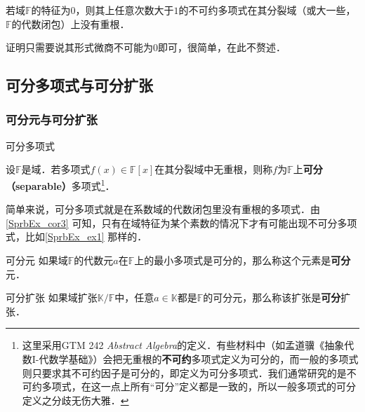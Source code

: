 \begin{corollary}{}\label{SprbEx_cor3}

若域$\mathbb{F}$的特征为$0$，则其上任意次数大于$1$的不可约多项式在其分裂域（或大一些，$\mathbb{F}$的代数闭包）上没有重根．

\end{corollary}

证明只需要说其形式微商不可能为$0$即可，很简单，在此不赘述．




\subsection{可分多项式与可分扩张}



\subsubsection{可分元与可分扩张}



\begin{definition}{可分多项式}\label{SprbEx_def2}

设$\mathbb{F}$是域．若多项式$f(x)\in\mathbb{F}[x]$在其分裂域中无重根，则称$f$为$\mathbb{F}$上\textbf{可分（separable）}多项式\footnote{这里采用GTM 242 \textsl{Abstract Algebra}的定义．有些材料中（如孟道骥《抽象代数I-代数学基础》）会把无重根的\textbf{不可约}多项式定义为可分的，而一般的多项式则只要求其不可约因子是可分的，即定义为可分多项式．我们通常研究的是不可约多项式，在这一点上所有“可分”定义都是一致的，所以一般多项式的可分定义之分歧无伤大雅．}．


\end{definition}

简单来说，可分多项式就是在系数域的代数闭包里没有重根的多项式．由\autoref{SprbEx_cor3} 可知，只有在域特征为某个素数的情况下才有可能出现不可分多项式，比如\autoref{SprbEx_ex1} 那样的．


\begin{definition}{可分元}
如果域$\mathbb{F}$的代数元$a$在$\mathbb{F}$上的最小多项式是可分的，那么称这个元素是\textbf{可分}元．
\end{definition}

\begin{definition}{可分扩张}
如果域扩张$\mathbb{K}/\mathbb{F}$中，任意$a\in\mathbb{K}$都是$\mathbb{F}$的可分元，那么称该扩张是\textbf{可分}扩张．
\end{definition}




